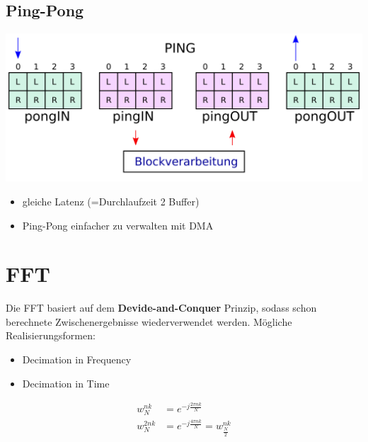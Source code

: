 \documentclass[10pt,a4paper]{article}
\begin{document}
\subsection{Ping-Pong}
  \begin{center}
      \includegraphics[width=.35\textwidth]{./img/pingpong.png}
  \end{center}
  \begin{itemize}
    \item gleiche Latenz (=Durchlaufzeit 2 Buffer)
    \item Ping-Pong einfacher zu verwalten mit DMA
  \end{itemize}
\section{FFT}
Die FFT basiert auf dem \textbf{Devide-and-Conquer} Prinzip,
sodass schon berechnete Zwischenergebnisse wiederverwendet werden.
Mögliche Realisierungsformen:
\begin{itemize}
    \item Decimation in Frequency
    \item Decimation in Time 
\end{itemize}
  \begin{mdframed}[style=exercise]
    \begin{align}
        w_N^{nk}&=e^{-j\frac{2\pi nk}{N}}\\
        w_N^{2nk}&=e^{-j\frac{4\pi nk}{N}}=w_{\frac{N}{2}}^{nk}
    \end{align}
  \end{mdframed}
\end{document}
